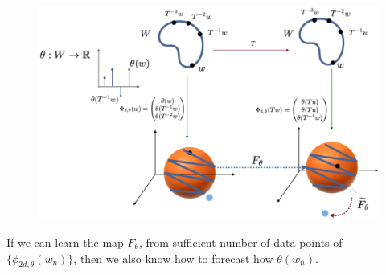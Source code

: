 \documentclass[a4paper,12pt,twoside]{report}
\newcommand{\Ftheta}{\ensuremath{F_\theta}}
\begin{document}
\begin{figure}[ht]
  \includegraphics[scale=0.25]{_takensmap.eps}
  \centering
  \label{fig:takensmap}
\end{figure}

If we can learn the map $F_\theta$, from sufficient number of data points of $\{\phi_{2d,\theta}(w_n)\}$, then we also know how to forecast how $\theta(w_n)$. 



\end{document}
